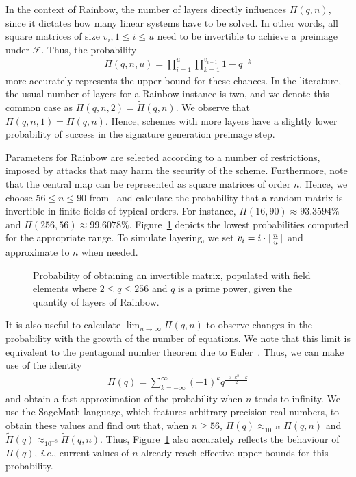 \documentclass[draft, 12pt, a4paper, oneside]{memoir}
\DeclareMathOperator*{\argmin}{argmin}
\DeclarePairedDelimiter{\ceil}{\lceil}{\rceil}
\theoremstyle{definition}
\begin{document}
In the context of Rainbow, the number of layers directly influences
$\Pi(q, n)$, since it dictates how many linear systems have to be solved. In
other words, all square matrices of size $v_{i}, 1 \leq i \leq u$ need to
be invertible to achieve a preimage under $\mathcal{F}$. Thus, the probability
\begin{align}
  \Pi(q, n, u) = \prod_{i = 1}^{u} \prod_{k = 1}^{v_{i + 1}} 1 - q^{-k}
\end{align}
more accurately represents the upper bound for these chances. In the
literature, the usual number of layers for a Rainbow instance is two, and we
denote this common case as $\Pi(q, n, 2) = \widetilde{\Pi}(q, n)$. We observe
that $\Pi(q, n, 1) = \Pi(q, n)$. Hence, schemes with more layers have a
slightly lower probability of success in the signature generation preimage
step.

Parameters for Rainbow are selected according to a number of restrictions,
imposed by attacks that may harm the security of the scheme. Furthermore, note
that the central map can be represented as square matrices of order $n$. Hence,
we choose $56 \leq n \leq 90$
from~\cite[Tables 6.4, 6.8, 6.13]{Petzoldt:201307} and calculate the
probability that a random matrix is invertible in finite fields of typical
orders. For instance, $\Pi(16, 90) \approx 93.3594\%$ and
$\Pi(256, 56) \approx 99.6078\%$. Figure~\ref{fig:1} depicts the lowest
probabilities computed for the appropriate range. To simulate layering, we set
$v_{i} = i \cdot \ceil{\frac{n}{u}}$ and approximate to $n$ when needed.

\begin{figure}[htbp]
  \subfloat[
    $\argmin_{56 \leq n \leq 90}$ of $\Pi(q, n)$
    and $\widetilde{\Pi}(q, n)$.\label{fig:1a}
  ]{
  }
  \caption{Probability of obtaining an invertible matrix, populated with field
    elements where $2 \leq q \leq 256$ and $q$ is a prime power, given the
    quantity of layers of Rainbow.}\label{fig:1}
\end{figure}

It is also useful to calculate $\lim_{n \to \infty} \Pi(q, n)$ to observe
changes in the probability with the growth of the number of equations. We note that this limit is equivalent to the pentagonal number theorem due to Euler~\cite[Theorem 14.3]{Apostol:2010}. Thus, we can make use of the identity
\begin{align}
  \Pi(q) = \sum_{k = -\infty}^{\infty}
    {(-1)}^{k} q^{\frac{-3 \cdot k^{2} + k}{2}}
\end{align}
and obtain a fast approximation of the probability when $n$ tends to infinity.
We use the SageMath language, which features arbitrary precision real numbers,
to obtain these values and find out that, when $n \geq 56$,
$\Pi(q) \approx_{10^{-18}} \Pi(q, n)$ and
$\widetilde{\Pi}(q) \approx_{10^{-8}} \widetilde{\Pi}(q, n)$.
Thus, Figure~\ref{fig:1} also accurately reflects the behaviour of $\Pi(q)$,
\emph{i.e.}, current values of $n$ already reach effective upper bounds for
this probability.
\end{document}
